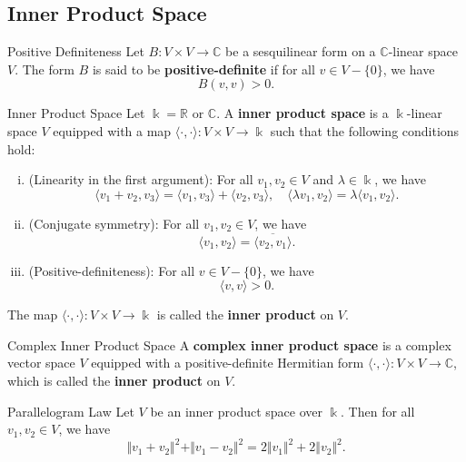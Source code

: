 \subsection{Inner Product Space}

\begin{definition}{Positive Definiteness}{}
    Let $B: V\times V\to \mathbb{C}$ be a sesquilinear form on a $\mathbb{C}$-linear space $V$. The form $B$ is said to be \textbf{positive-definite} if  for all $v\in V-\{0\}$, we have
    \[        
        B(v, v)> 0.
    \]
\end{definition}

\begin{definition}{Inner Product Space}{}
    Let $\Bbbk=\mathbb{R}\text{ or } \mathbb{C}$. A \textbf{inner product space} is a $\Bbbk$-linear space $V$ equipped with a map $\langle\cdot,\cdot\rangle: V\times V\to \Bbbk$ such that the following conditions hold:
    \begin{enumerate}[(i)]
        \item (Linearity in the first argument): For all $v_1, v_2\in V$ and $\lambda\in \Bbbk$, we have
        \[            \langle v_1 + v_2, v_3 \rangle = \langle v_1, v_3 \rangle + \langle v_2, v_3 \rangle,\quad \langle \lambda v_1, v_2   \rangle = \lambda \langle v_1, v_2 \rangle.
        \]
        \item (Conjugate symmetry): For all $v_1, v_2\in V$, we have
        \[            \langle v_1, v_2 \rangle = \overline{\langle v_2, v_1 \rangle}.
        \]
        \item (Positive-definiteness): For all $v\in V-\{0\}$, we have
        \[            \langle v, v \rangle > 0.
        \]
    \end{enumerate}
    The map $\langle\cdot,\cdot\rangle: V\times V\to \Bbbk$ is called the \textbf{inner product} on $V$.
\end{definition}

\begin{definition}{Complex Inner Product Space}{}
    A \textbf{complex inner product space} is a complex vector space $V$ equipped with a positive-definite Hermitian form $\langle\cdot,\cdot\rangle: V\times V\to \mathbb{C}$, which is called the \textbf{inner product} on $V$.
\end{definition}

\begin{proposition}{Parallelogram Law}{}
    Let $V$ be an inner product space over $\Bbbk$. Then for all $v_1, v_2\in V$, we have
    \[
        \Vert v_1+v_2\Vert^2 + \Vert v_1-v_2 \Vert^2 = 2\Vert v_1 \Vert^2 + 2\Vert v_2 \Vert^2.
    \]
\end{proposition}


